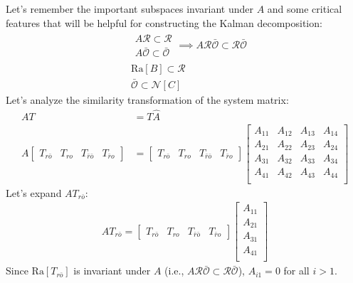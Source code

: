 \documentclass[twoside, 11pt, a4paper]{article}
\begin{document}
%
Let's remember the important subspaces invariant under $A$ and some critical features that will be helpful 
for constructing the Kalman decomposition:
\begin{align*}
    &\begin{array}{c} A \mathcal{R} \subset \mathcal{R}
    \\
    A \bar{\mathcal{O}} \subset \bar{\mathcal{O}} \end{array} \implies A \mathcal{R}\bar{\mathcal{O}} \subset \mathcal{R}\bar{\mathcal{O}}
    \\
    &\mathrm{Ra}[B] \subset \mathcal{R}
    \\
    &\bar{\mathcal{O}} \subset \mathcal{N}[C]
\end{align*}
%
Let's analyze the similarity transformation of the system matrix:
%
\begin{align*}
    A T &=  T \hat{A}
    \\
    A \left[ \begin{array}{c|c|c|c} T_{r\bar{o}} & T_{ro} & T_{\bar{r} \bar{o}} & T_{\bar{r} o} \end{array} \right]
    &= \left[ \begin{array}{c|c|c|c} T_{r\bar{o}} & T_{ro} & T_{\bar{r} \bar{o}} & T_{\bar{r} o} \end{array} \right]
    \left[ \begin{array}{c|c|c|c} A_{11} & A_{12} & A_{13} & A_{14} \\ \hline 
    A_{21} & A_{22} & A_{23} & A_{24} \\ \hline 
    A_{31} & A_{32} & A_{33} & A_{34} \\ \hline 
    A_{41} & A_{42} & A_{43} & A_{44} \\ 
    \end{array} \right]
\end{align*}
%
Let's expand $A T_{r\bar{o}}$:
%
\begin{align*}
    A T_{r\bar{o}} = \left[ \begin{array}{c|c|c|c} T_{r\bar{o}} & T_{ro} & T_{\bar{r} \bar{o}} & T_{\bar{r} o} \end{array} \right]
    \left[ \begin{array}{c} A_{11} \\ \hline 
    A_{21} \\ \hline 
    A_{31} \\ \hline 
    A_{41} \\ 
    \end{array} \right]
\end{align*}
%
Since $\mathrm{Ra}[ T_{r\bar{o}} ]$ is invariant under $A$ (i.e., $A \mathcal{R}\bar{\mathcal{O}} \subset \mathcal{R}\bar{\mathcal{O}}$), 
$A_{i1} = 0$ for all $i > 1$. 
\end{document}
